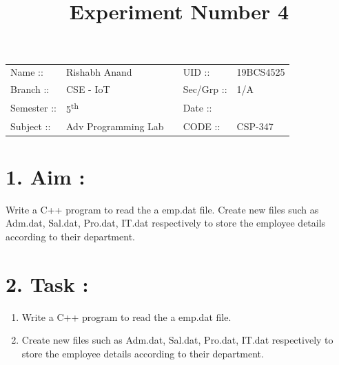 \documentclass[14pt]{extarticle}
\title{%
    \textbf{
    \vspace{-3em} \\ 
    \Large Experiment Number 4\\
    \vspace{-4em}
    }
}
\author{}
\date{}
\begin{document}
\maketitle %

\section*{}
    \begin{tabular}{ llp{2cm}ll } 
        Name :: & Rishabh Anand & & UID :: & 19BCS4525  \\ 
        Branch :: & CSE - IoT & & Sec/Grp :: & 1/A \\ 
        Semester :: & 5\textsuperscript{th} & & Date :: & \shortdate{\today} \\
        Subject :: & Adv Programming Lab & & CODE :: & CSP-347  \\ 
    \end{tabular}
    
\vspace{1em}

\section*{\normalsize 1. Aim :}

Write a C++ program to read the a emp.dat file. Create new files such as Adm.dat, Sal.dat, Pro.dat, IT.dat respectively to store the employee details according to their department.

\section*{\normalsize 2. Task :}

\begin{enumerate}
  \item Write a C++ program to read the a emp.dat file. 
  \item Create new files such as Adm.dat, Sal.dat, Pro.dat, IT.dat respectively to store the employee details according to their department.
\end{enumerate}

\end{document}
